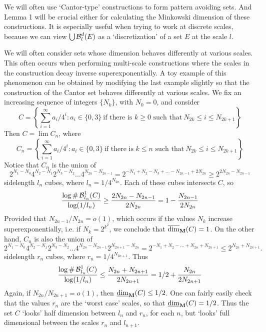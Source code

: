 We will often use `Cantor-type' constructions to form pattern avoiding sets. And Lemma 1 will be crucial either for calculating the Minkowski dimension of these constructions. It is especially useful when trying to work at discrete scales, because we can view $\bigcup \operatorname{\mathcal{B}}^d_l(E)$ as a `discretization' of a set $E$ at the scale $l$.

\begin{example}
	We will often consider sets whose dimension behaves differently at various scales. This often occurs when performing multi-scale constructions where the scales in the construction decay inverse superexponentially. A toy example of this phenomenon can be obtained by modifying the last example slightly so that the construction of the Cantor set behaves differently at various scales. We fix an increasing sequence of integers $\{ N_k \}$, with $N_0 = 0$, and consider
	\[ C = \left\{ \sum_{i = 1}^\infty a_i/4^i : a_i \in \{ 0, 3 \}\ \text{if there is $k \geq 0$ such that}\ N_{2k} \leq i \leq N_{2k+1} \right\} \]
	Then $C = \lim C_n$, where
	\[ C_n = \left\{ \sum_{i = 1}^\infty a_i/4^i : a_i \in \{ 0, 3 \}\ \text{if there is $k \leq n$ such that}\ N_{2k} \leq i \leq N_{2k+1} \right\} \]
	Notice that $C_n$ is the union of
	\[ 2^{N_1 - N_0} 4^{N_2 - N_1} 2^{N_3 - N_2} \dots 4^{N_{2n} - N_{2n-1}} = 2^{-N_1+N_2-N_3+\dots - N_{2n-1} + 2N_{2n}} \geq 2^{2N_{2n} - N_{2n-1}} \]
	sidelength $l_n$ cubes, where $l_n = 1/4^{N_{2n}}$. Each of these cubes intersects $C$, so
	\[ \frac{\log \# \operatorname{\mathcal{B}}^1_{l_n}(C)}{\log(1/l_n)} \geq \frac{2N_{2n} - N_{2n-1}}{2N_{2n}} = 1 - \frac{N_{2n-1}}{2N_{2n}} \]
	Provided that $N_{2n-1}/N_{2n} = o(1)$, which occurs if the values $N_k$ increase superexponentially, i.e. if $N_k = 2^{k^2}$, we conclude that $\operatorname{\overline{\dim}_{\mathbf{M}}}(C) = 1$. On the other hand, $C_n$ is also the union of
	\[ 2^{N_1 - N_0} 4^{N_2 - N_1} 2^{N_3 - N_2} \dots 4^{N_{2n} - N_{2n-1}} 2^{N_{2n+1} - N_{2n}} = 2^{- N_1 + N_2 - \dots + N_{2n} + N_{2n+1}} \leq 2^{N_{2n} + N_{2n+1}}. \]
	sidelength $r_n$ cubes, where $r_n = 1/4^{N_{2n+1}}$. Thus
	\[ \frac{\log \# \operatorname{\mathcal{B}}^1_{l_n}(C)}{\log(1/l_n)} \leq \frac{N_{2n} + N_{2n+1}}{2N_{2n+1}} = 1/2 + \frac{N_{2n}}{2N_{2n+1}} \]
	Again, if $N_{2n}/N_{2n+1} = o(1)$, then $\operatorname{\underline{\dim}_{\mathbf{M}}}(C) \leq 1/2$. One can fairly easily check that the values $r_n$ are the `worst case' scales, so that $\operatorname{\underline{\dim}_{\mathbf{M}}}(C) = 1/2$. Thus the set $C$ `looks' half dimension between $l_n$ and $r_n$, for each $n$, but `looks' full dimensional between the scales $r_n$ and $l_{n+1}$.
\end{example}

